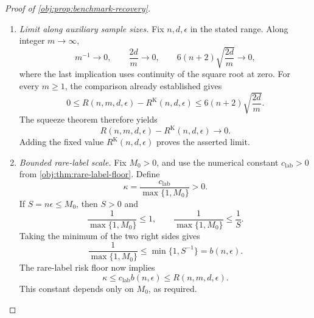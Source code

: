 \documentclass[11pt]{article}
\begin{document}
\begin{proof}[Proof of \cref{obj:prop:benchmark-recovery}]
\begin{enumerate}
\item \emph{Limit along auxiliary sample sizes.}
Fix \(n,d,\epsilon\) in the stated range. Along integer \(m\to\infty\),
\[
m^{-1}\longrightarrow0,
\qquad
\frac{2d}{m}\longrightarrow0,
\qquad
6(n+2)\sqrt{\frac{2d}{m}}\longrightarrow0,
\]
where the last implication uses continuity of the square root at zero. For every \(m\ge1\), the comparison already established gives
\[
0\le R(n,m,d,\epsilon)-R^{\mathrm K}(n,d,\epsilon)
\le6(n+2)\sqrt{\frac{2d}{m}}.
\]
The squeeze theorem therefore yields
\[
R(n,m,d,\epsilon)-R^{\mathrm K}(n,d,\epsilon)\longrightarrow0.
\]
Adding the fixed value \(R^{\mathrm K}(n,d,\epsilon)\) proves the asserted limit.

\item \emph{Bounded rare-label scale.}
Fix \(M_0>0\), and use the numerical constant \(c_{\mathrm{lab}}>0\) from
\cref{obj:thm:rare-label-floor}. Define
\[
\kappa=\frac{c_{\mathrm{lab}}}{\max\{1,M_0\}}>0.
\]
If \(S=n\epsilon\le M_0\), then \(S>0\) and
\[
\frac1{\max\{1,M_0\}}\le1,
\qquad
\frac1{\max\{1,M_0\}}\le\frac1S.
\]
Taking the minimum of the two right sides gives
\[
\frac1{\max\{1,M_0\}}
\le\min\{1,S^{-1}\}=b(n,\epsilon).
\]
The rare-label risk floor now implies
\[
\kappa
\le c_{\mathrm{lab}}b(n,\epsilon)
\le R(n,m,d,\epsilon).
\]
This constant depends only on \(M_0\), as required.
\end{enumerate}
\end{proof}
\end{document}
